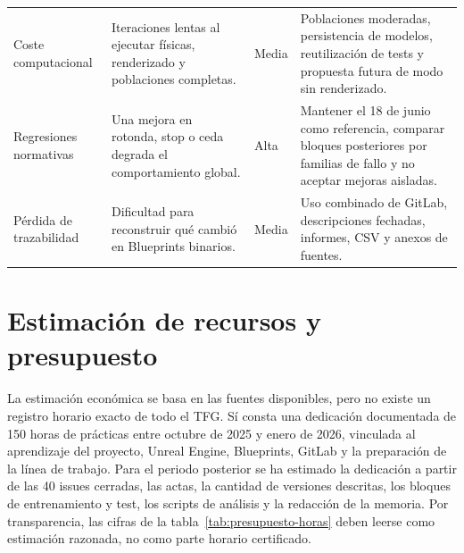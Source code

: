 {\begin{longtable}{L{3.05cm}L{3.6cm}L{1.55cm}L{5.35cm}}
Coste computacional & Iteraciones lentas al ejecutar físicas, renderizado y poblaciones completas. & Media & Poblaciones moderadas, persistencia de modelos, reutilización de tests y propuesta futura de modo sin renderizado.\\
Regresiones normativas & Una mejora en rotonda, stop o ceda degrada el comportamiento global. & Alta & Mantener el 18 de junio como referencia, comparar bloques posteriores por familias de fallo y no aceptar mejoras aisladas.\\
Pérdida de trazabilidad & Dificultad para reconstruir qué cambió en Blueprints binarios. & Media & Uso combinado de GitLab, descripciones fechadas, informes, CSV y anexos de fuentes.\\
\end{longtable}
}

\section{Estimación de recursos y presupuesto}

La estimación económica se basa en las fuentes disponibles, pero no existe un registro horario exacto de todo el TFG. Sí consta una dedicación documentada de 150 horas de prácticas entre octubre de 2025 y enero de 2026, vinculada al aprendizaje del proyecto, Unreal Engine, Blueprints, GitLab y la preparación de la línea de trabajo. Para el periodo posterior se ha estimado la dedicación a partir de las 40 issues cerradas, las actas, la cantidad de versiones descritas, los bloques de entrenamiento y test, los scripts de análisis y la redacción de la memoria. Por transparencia, las cifras de la tabla~\ref{tab:presupuesto-horas} deben leerse como estimación razonada, no como parte horario certificado.

